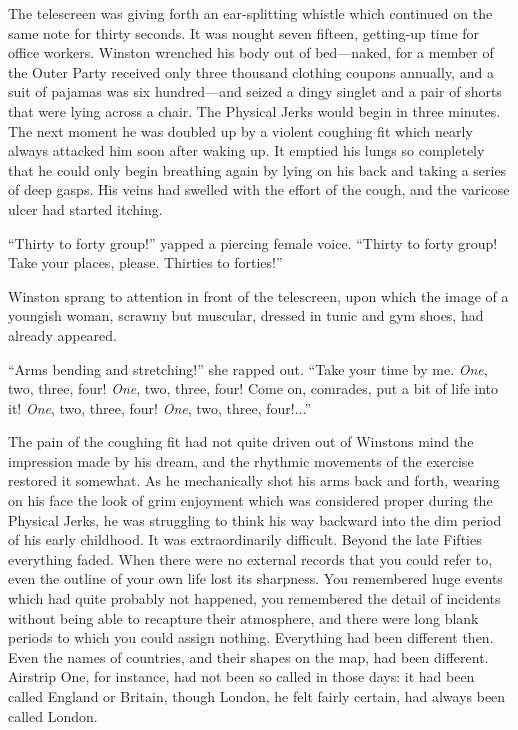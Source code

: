 The telescreen was giving forth an ear-splitting whistle which continued
on the same note for thirty seconds. It was nought seven fifteen,
getting-up time for office workers. Winston wrenched his body out of
bed---naked, for a member of the Outer Party received only three
thousand clothing coupons annually, and a suit of pajamas was six
hundred---and seized a dingy singlet and a pair of shorts that were
lying across a chair. The Physical Jerks would begin in three minutes.
The next moment he was doubled up by a violent coughing fit which nearly
always attacked him soon after waking up. It emptied his lungs so
completely that he could only begin breathing again by lying on his back
and taking a series of deep gasps. His veins had swelled with the effort
of the cough, and the varicose ulcer had started itching.

``Thirty to forty group!'' yapped a piercing female voice. ``Thirty to
forty group! Take your places, please. Thirties to forties!''

Winston sprang to attention in front of the telescreen, upon which the
image of a youngish woman, scrawny but muscular, dressed in tunic and
gym shoes, had already appeared.

``Arms bending and stretching!'' she rapped out. ``Take your time by me.
\emph{One}, two, three, four! \emph{One}, two, three, four! Come on,
comrades, put a bit of life into it! \emph{One}, two, three, four!
\emph{One}, two, three, four!...''

The pain of the coughing fit had not quite driven out of
Winston\textquotesingle s mind the impression made by his dream, and the
rhythmic movements of the exercise restored it somewhat. As he
mechanically shot his arms back and forth, wearing on his face the look
of grim enjoyment which was considered proper during the Physical Jerks,
he was struggling to think his way backward into the dim period of his
early childhood. It was extraordinarily difficult. Beyond the late
Fifties everything faded. When there were no external records that you
could refer to, even the outline of your own life lost its sharpness.
You remembered huge events which had quite probably not happened, you
remembered the detail of incidents without being able to recapture their
atmosphere, and there were long blank periods to which you could assign
nothing. Everything had been different then. Even the names of
countries, and their shapes on the map, had been different. Airstrip
One, for instance, had not been so called in those days: it had been
called England or Britain, though London, he felt fairly certain, had
always been called London.

